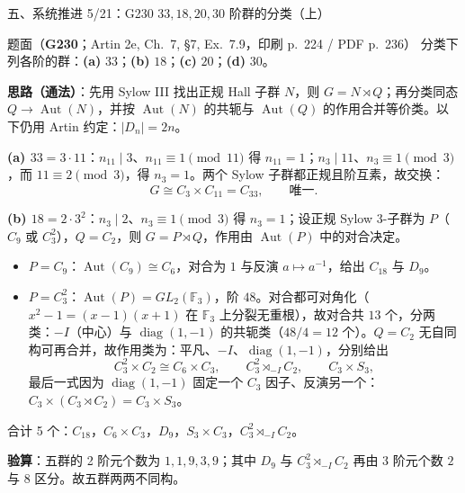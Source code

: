 \documentclass[aspectratio=169,10pt,fontset=none]{ctexbeamer}
\newcommand{\ex}[1]{\textcolor{accent}{\footnotesize\bfseries #1}}
\newcommand{\key}[1]{\textcolor{ink}{\bfseries #1}}
\begin{document}
\begin{frame}[t]{五、系统推进 5/21：G230 $33,18,20,30$ 阶群的分类（上）}
\label{ex:G230}
\scriptsize
\begin{block}{\footnotesize 题面（\ex{G230}；Artin 2e, Ch.~7, §7, Ex.~7.9，印刷 p.~224 / PDF p.~236）}
分类下列各阶的群：\textbf{(a)} $33$；\textbf{(b)} $18$；\textbf{(c)} $20$；\textbf{(d)} $30$。
\end{block}
\key{思路（通法）}：先用 Sylow III 找出正规 Hall 子群 $N$，则 $G=N\rtimes Q$；再分类同态 $Q\to\operatorname{Aut}(N)$，并按 $\operatorname{Aut}(N)$ 的共轭与 $\operatorname{Aut}(Q)$ 的作用合并等价类。以下仍用 Artin 约定：$|D_n|=2n$。

\key{(a) $33=3\cdot11$}：$n_{11}\mid3$、$n_{11}\equiv1\pmod{11}$ 得 $n_{11}=1$；$n_3\mid11$、$n_3\equiv1\pmod3$，而 $11\equiv2\pmod3$，得 $n_3=1$。两个 Sylow 子群都正规且阶互素，故交换：
\[ G\cong C_3\times C_{11}=C_{33},\qquad\text{唯一}. \]

\key{(b) $18=2\cdot3^2$}：$n_3\mid2$、$n_3\equiv1\pmod3$ 得 $n_3=1$；设正规 Sylow 3-子群为 $P$（$C_9$ 或 $C_3^2$），$Q=C_2$，则 $G=P\rtimes Q$，作用由 $\operatorname{Aut}(P)$ 中的对合决定。
\begin{itemize}
\item $P=C_9$：$\operatorname{Aut}(C_9)\cong C_6$，对合为 $1$ 与反演 $a\mapsto a^{-1}$，给出 $C_{18}$ 与 $D_9$。
\item $P=C_3^2$：$\operatorname{Aut}(P)=GL_2(\mathbb F_3)$，阶 $48$。对合都可对角化（$x^2-1=(x-1)(x+1)$ 在 $\mathbb F_3$ 上分裂无重根），故对合共 $13$ 个，分两类：$-I$（中心）与 $\operatorname{diag}(1,-1)$ 的共轭类（$48/4=12$ 个）。$Q=C_2$ 无自同构可再合并，故作用类为：平凡、$-I$、$\operatorname{diag}(1,-1)$，分别给出
\[ C_3^2\times C_2\cong C_6\times C_3,\qquad C_3^2\rtimes_{-I}C_2,\qquad C_3\times S_3, \]
最后一式因为 $\operatorname{diag}(1,-1)$ 固定一个 $C_3$ 因子、反演另一个：$C_3\times(C_3\rtimes C_2)=C_3\times S_3$。
\end{itemize}
合计 5 个：$C_{18}$，$C_6\times C_3$，$D_9$，$S_3\times C_3$，$C_3^2\rtimes_{-I}C_2$。

\key{验算}：五群的 2 阶元个数为 $1,1,9,3,9$；其中 $D_9$ 与 $C_3^2\rtimes_{-I}C_2$ 再由 3 阶元个数 $2$ 与 $8$ 区分。故五群两两不同构。
\end{frame}
\end{document}
